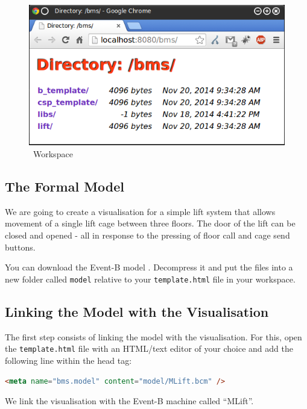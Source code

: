 \begin{figure}[!ht]
\begin{center}
	\includegraphics[width=12cm]{img/tutorial/tut_01.png}
	\caption{\bms~Workspace}
	\label{fig_tut_01_workspace}
\end{center}
\end{figure}

\subsection{The Formal Model}

We are going to create a visualisation for a simple lift system that allows movement of a single lift cage between three floors.
The door of the lift can be closed and opened - all in response to the pressing of floor call and cage send buttons.

You can download the Event-B model .
Decompress it and put the files into a new folder called \texttt{model} relative to your \texttt{template.html} file in your workspace.

\subsection{Linking the Model with the Visualisation}

The first step consists of linking the model with the visualisation.
For this, open the \texttt{template.html} file with an HTML/text editor of your choice and add the following line within the head tag:

\begin{lstlisting}[language=html]
<meta name="bms.model" content="model/MLift.bcm" />
\end{lstlisting}

We link the visualisation with the Event-B machine called ``MLift''.

